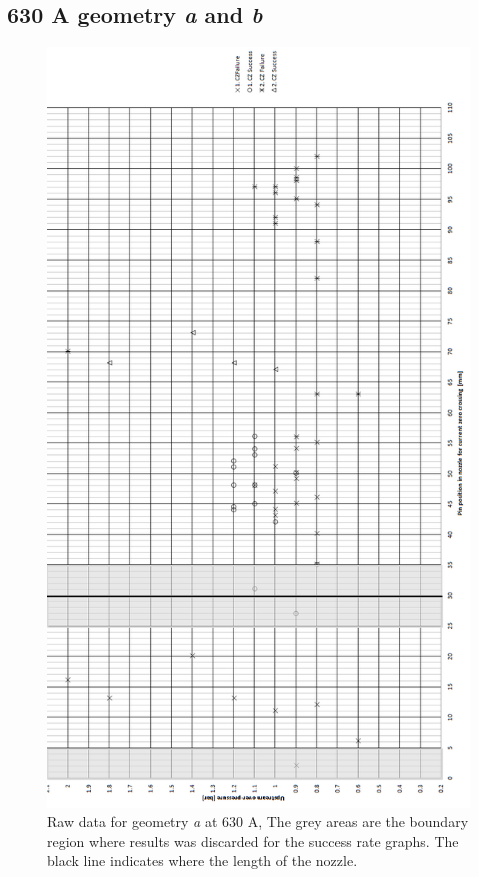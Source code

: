 \documentclass[10pt,a4paper,twoside]{article}
\begin{document}
\subsection{630 A geometry \textit{a} and \textit{b}} \label{app:testResults630A}
\begin{figure}[H]
\centering
\includegraphics[scale=0.55]{Bilder/Results/rawData630AgeoA.png}
\caption{Raw data for geometry \textit{a} at 630 A, The grey areas are the boundary region where results was discarded for the success rate graphs. The black line indicates where the length of the nozzle.} \label{fig:rawData630AgeoA}
\end{figure}
\newpage
\end{document}
